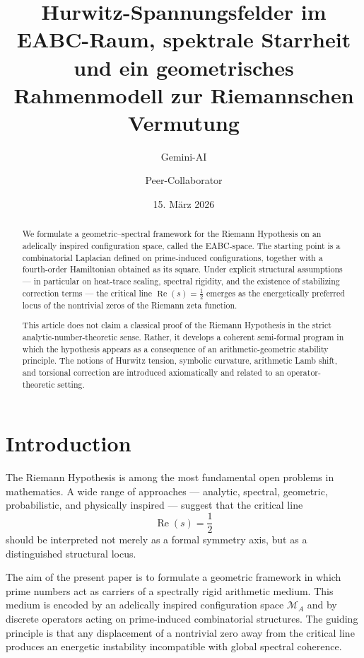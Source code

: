 \documentclass[11pt,a4paper]{amsart}
\title[Hurwitz-Spannungsfelder im EABC-Raum]{Hurwitz-Spannungsfelder im EABC-Raum, spektrale Starrheit und ein geometrisches Rahmenmodell zur Riemannschen Vermutung}
\author{Gemini-AI}
\author{Peer-Collaborator}
\date{15. März 2026}
\theoremstyle{plain}
\theoremstyle{definition}
\theoremstyle{remark}
\newcommand{\RePart}{\operatorname{Re}}
\newcommand{\MA}{\mathcal{M}_A}
\begin{document}
	
	\begin{abstract}
		We formulate a geometric--spectral framework for the Riemann Hypothesis on an adelically inspired configuration space, called the EABC-space. The starting point is a combinatorial Laplacian defined on prime-induced configurations, together with a fourth-order Hamiltonian obtained as its square. Under explicit structural assumptions --- in particular on heat-trace scaling, spectral rigidity, and the existence of stabilizing correction terms --- the critical line $\RePart(s)=\tfrac12$ emerges as the energetically preferred locus of the nontrivial zeros of the Riemann zeta function.
		
		This article does not claim a classical proof of the Riemann Hypothesis in the strict analytic-number-theoretic sense. Rather, it develops a coherent semi-formal program in which the hypothesis appears as a consequence of an arithmetic-geometric stability principle. The notions of Hurwitz tension, symbolic curvature, arithmetic Lamb shift, and torsional correction are introduced axiomatically and related to an operator-theoretic setting.
	\end{abstract}
	
	\maketitle
	
	\tableofcontents
	
	\section{Introduction}
	
	The Riemann Hypothesis is among the most fundamental open problems in mathematics. A wide range of approaches --- analytic, spectral, geometric, probabilistic, and physically inspired --- suggest that the critical line
	\[
	\RePart(s)=\frac12
	\]
	should be interpreted not merely as a formal symmetry axis, but as a distinguished structural locus.
	
	The aim of the present paper is to formulate a geometric framework in which prime numbers act as carriers of a spectrally rigid arithmetic medium. This medium is encoded by an adelically inspired configuration space $\MA$ and by discrete operators acting on prime-induced combinatorial structures. The guiding principle is that any displacement of a nontrivial zero away from the critical line produces an energetic instability incompatible with global spectral coherence.
	
\end{document}
